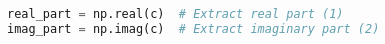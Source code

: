\begin{lstlisting}[language=Python, style=mystyle2]
real_part = np.real(c)  # Extract real part (1)
imag_part = np.imag(c)  # Extract imaginary part (2)
\end{lstlisting}






